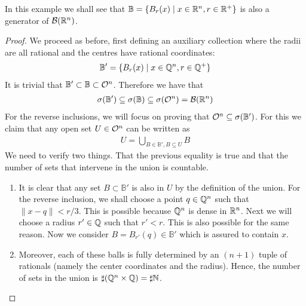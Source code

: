\newcommand{\B}{\mathbb{B}}
\begin{eg}
	In this example we shall see that $\B = \{B_r(x) \mid x \in \R^n, r \in \R^+\}$ is also a generator of $\mathcal{B}(\mathbb{R}^n)$.
	
	\begin{proof}
		We proceed as before, first defining an auxiliary collection where the radii are all rational and the centres have rational coordinates:
		\begin{align*}
			\B' = \{B_r(x) \mid x \in \Q^n, r \in \Q^+\}
		\end{align*}
		It is trivial that $\B' \subset \B \subset \OS^n$. Therefore we have that
		\begin{align*}
			\sigma(\B') \subseteq \sigma(\B) \subseteq \sigma(\OS^n) = \borel(\R^n)
		\end{align*}
		For the reverse inclusions, we will focus on proving that $\OS^n \subseteq \sigma(\B')$. For this we claim that any open set $U \in \mathcal{O}^n$ can be written as
		\begin{align*}
			U = \bigcup_{B \in \B', B \subseteq U} B
		\end{align*}
		We need to verify two things. That the previous equality is true and that the number of sets that intervene in the union is countable.
		\begin{enumerate}
			\item It is clear that any set $B\subset \B'$ is also in $U$ by the definition of the union. For the reverse inclusion, we shall choose a point $q \in \mathbb{Q}^n$ such that $\lVert x - q \rVert < r / 3$. This is possible because $\mathbb{Q}^n$ is dense in $\mathbb{R}^n$. Next we will choose a radius $r' \in \mathbb{Q}$ such that $r' < r$. This is also possible for the same reason. Now we consider $B = B_{r'}(q) \in \B'$ which is assured to contain $x$.
			
			\item Moreover, each of these balls is fully determined by an $(n+1)$ tuple of rationals (namely the center coordinates and the radius). Hence, the number of sets in the union is $\sharp(\mathbb{Q}^n \times \mathbb{Q}) = \sharp \mathbb{N}$.
		\end{enumerate}
	\end{proof}
\end{eg}